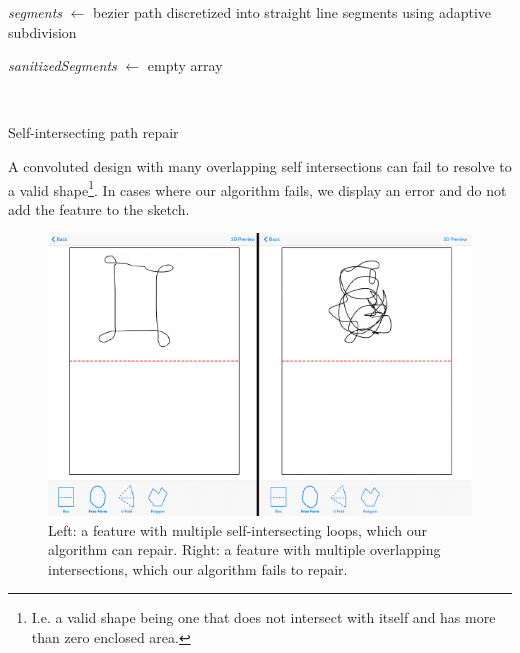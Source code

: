 \begin{algorithm}[H]

 \textit{segments} $\leftarrow$ bezier path discretized into straight line segments using adaptive subdivision 
 
 \textit{sanitizedSegments} $\leftarrow$ empty array
  
 
  \
 
\caption{Self-intersecting path repair}
\end{algorithm}

A convoluted design with many overlapping self intersections can fail to
resolve to a valid shape\footnote{I.e. a valid shape being one that does
  not intersect with itself and has more than zero enclosed area.}. In
cases where our algorithm fails, we display an error and do not add the
feature to the sketch.

\begin{figure}[htbp]
\centering
\includegraphics{figures/41_Tech_Tool_Implementation/succeedFailSelfIntersections.pdf}
\caption{Left: a feature with multiple self-intersecting loops, which
our algorithm can repair. Right: a feature with multiple overlapping
intersections, which our algorithm fails to repair.}
\end{figure}

